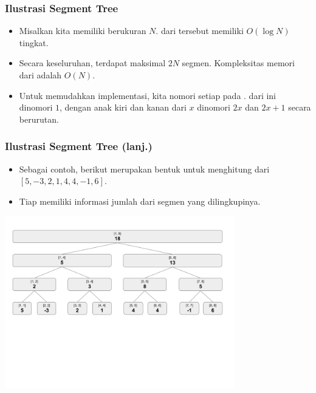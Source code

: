 \begin{frame}
\frametitle{Ilustrasi Segment Tree}
\begin{itemize}
  \item Misalkan kita memiliki \farray berukuran $N$. \fSegmentTree dari \farray tersebut memiliki $O(\log N)$ tingkat.
  \item Secara keseluruhan, terdapat maksimal $2N$ segmen. Kompleksitas memori dari \fsegmentTree adalah $O(N)$.
  \item Untuk memudahkan implementasi, kita nomori setiap \fnode pada \fsegmentTree. \fRoot dari \ftree ini dinomori $1$, dengan anak kiri dan kanan dari \fnode $x$ dinomori $2x$ dan $2x + 1$ secara berurutan.
\end{itemize}
\end{frame}

\begin{frame}
\frametitle{Ilustrasi Segment Tree (lanj.)}
\begin{itemize}
  \item Sebagai contoh, berikut merupakan bentuk \fsegmentTree untuk menghitung \frangeSumQuery dari \farray $[5, -3, 2, 1, 4, 4, -1, 6]$.
  \item Tiap \fnode memiliki informasi jumlah dari segmen yang dilingkupinya.
\end{itemize}
\begin{center}
  \includegraphics[width=10cm]{asset/segtree-init.png}
\end{center}
\end{frame}

